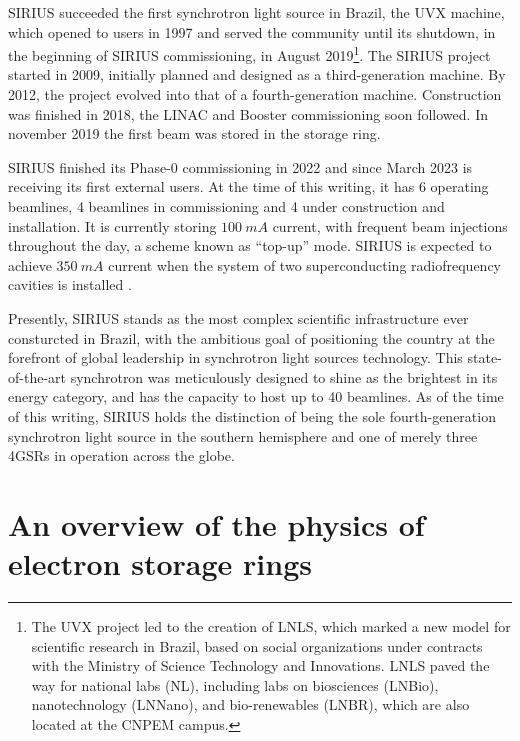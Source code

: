 SIRIUS succeeded the first synchrotron light source in Brazil, the UVX machine, which opened to users in 1997 and served the community until its shutdown, in the beginning of SIRIUS commissioning, in August 2019\footnote{The UVX project led to the creation of LNLS, which marked a new model for scientific research in Brazil, based on social organizations under contracts with the Ministry of Science Technology and Innovations. LNLS paved the way for national labs (NL), including labs on biosciences (LNBio), nanotechnology (LNNano), and bio-renewables (LNBR), which are also located at the CNPEM campus.}\cite{liu_synchrotron_2019}. The SIRIUS project started in 2009, initially planned and designed as a third-generation machine. By 2012, the project evolved into that of a fourth-generation machine\cite{liu_synchrotron_2019}. Construction was finished in 2018, the LINAC and Booster commissioning soon followed. In november 2019 the first beam was stored in the storage ring.

SIRIUS finished its Phase-0 commissioning in 2022 and since March 2023 is receiving its first external users. At the time of this writing,  it has 6 operating beamlines, 4 beamlines in commissioning and 4 under construction and installation. It is currently storing $100~\unit{mA}$ current, with frequent beam injections throughout the day, a scheme known as ``top-up'' mode. SIRIUS is expected to achieve $350~\unit{mA}$ current when the system of two superconducting radiofrequency cavities is installed \cite{liu_status_2022,liu_status_2023}.

Presently, SIRIUS stands as the most complex scientific infrastructure ever consturcted in Brazil, with the ambitious goal of positioning the country at the forefront of global leadership in synchrotron light sources technology. This state-of-the-art synchrotron was meticulously designed to shine as the brightest in its energy category, and has the capacity to host up to 40 beamlines. As of the time of this writing, SIRIUS holds the distinction of being the sole fourth-generation synchrotron light source in the southern hemisphere and one of merely three 4GSRs in operation across the globe.

\section{An overview of the physics of electron storage rings}

